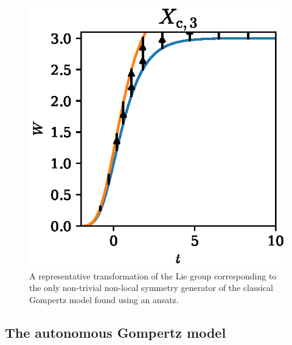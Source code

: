 \begin{figure}
  \centering
  \includegraphics[width=.3355\textwidth]{images/gompertz-classical-ansatz}
  \caption{
    A representative transformation of the Lie group corresponding to the only non-trivial non-local symmetry generator of the classical Gompertz model found using an ansatz.
  }
  \label{fig:gompertz-classical-ansatz}
\end{figure}

\subsection{The autonomous Gompertz model}

